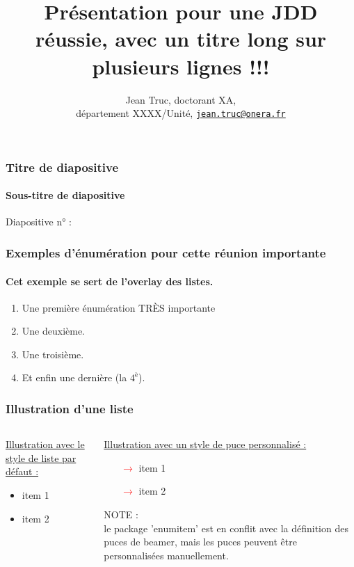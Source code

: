 \documentclass[compress,10pt,aspectratio=169]{beamer}
\title[Joli titre un peu long]{Présentation pour une JDD réussie, avec un titre long sur plusieurs lignes !!!}
\subtitle[]{Jean Truc, doctorant XA,  \\
département XXXX/Unité, \href{mailto:jean.truc@onera.fr}{\texttt{jean.truc@onera.fr}}}
\author[J. Truc]{}
\date[aujoud'hui]{}
\institute{\inst{1}ONERA,\inst{2}AUTRE}
\begin{document}
\MakeTitlePage





\begin{frame}
\frametitle{Titre de diapositive}
\framesubtitle{Sous-titre de diapositive}
    Diapositive n° : \insertframenumber
\end{frame}

\begin{frame} 
\frametitle{Exemples d'énumération pour cette réunion importante} 
\framesubtitle{Cet exemple se sert de l'overlay des listes.} 
\begin{enumerate} 
\item<1-| alert@1> Une première énumération TR\`ES importante 
\item<2-> Une deuxième. 
\item<3-> Une troisième. 
\item<4-> Et enfin une dernière (la $4^{\mbox{è}}$).
\end{enumerate}
\end{frame}

\begin{frame}
\frametitle{Illustration d'une liste}
\begin{columns}
    \begin{column}{0.5\textwidth}
    \centering
    \underline{Illustration avec le style de liste par défaut :}
	\begin{itemize}
	    \item item 1
    	    \item item 2
	\end{itemize}
    \end{column}
    \begin{column}{0.5\textwidth}
    \underline{Illustration avec un style de puce personnalisé :}
    	\begin{itemize}
    	    \item[\textcolor{red}{$\rightarrow$}] item 1
    	    \item[\textcolor{red}{$\rightarrow$}] item 2
    	\end{itemize}
    \begin{flushleft}
    \footnotesize NOTE :\\
    le package 'enumitem' est en conflit avec la définition des puces de beamer, mais les puces peuvent être personnalisées manuellement.
    \end{flushleft}
    \end{column}
\end{columns}
\end{frame}
\end{document}
